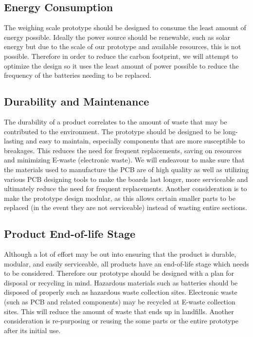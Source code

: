 \subsection{Energy Consumption}

The weighing scale prototype should be designed to consume the least amount of energy possible. Ideally the power source should be renewable, such as solar energy but due to the scale of our prototype and available resources, this is not possible. Therefore in order to reduce the carbon footprint, we will attempt to optimize the design so it uses the least amount of power possible to reduce the frequency of the batteries needing to be replaced.

\subsection{Durability and Maintenance}

The durability of a product correlates to the amount of waste that may be contributed to the environment. The prototype should be designed to be long-lasting and easy to maintain, especially components that are more susceptible to breakages. This reduces the need for frequent replacements, saving on resources and minimizing E-waste (electronic waste). We will endeavour to make sure that the materials used to manufacture the PCB are of high quality as well as utilizing various PCB designing tools to make the boards last longer, more serviceable and ultimately reduce the need for frequent replacements. Another consideration is to make the prototype design modular, as this allows certain smaller parts to be replaced (in the event they are not serviceable) instead of wasting entire sections. 

\subsection{Product End-of-life Stage}

Although a lot of effort may be out into ensuring that the product is durable, modular, and easily serviceable, all products have an end-of-life stage which needs to be considered. Therefore our prototype should be designed with a plan for disposal or recycling in mind. Hazardous materials such as batteries should be disposed of properly such as hazardous waste collection sites. Electronic waste (such as PCB and related components) may be recycled at E-waste collection sites. This will reduce the amount of waste that ends up in landfills. Another consideration is re-purposing or reusing the some parts or the entire prototype after its initial use.


